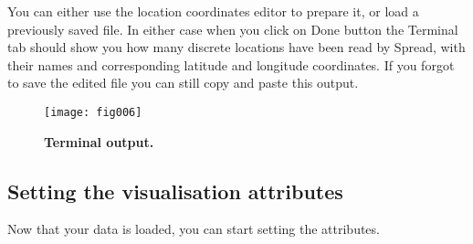 You can either use the location coordinates editor to prepare it,
or load a previously saved file. In either case when you click on
Done button the Terminal tab should show you how many discrete locations
have been read by Spread, with their names and corresponding latitude
and longitude coordinates. If you forgot to save the edited file you
can still copy and paste this output.

\begin{figure}[H]
\begin{centering}
\texttt{[image: fig006]}
\caption{
{ \footnotesize 
{\bf Terminal output.}
} %
}
\label{fig:006}
\par\end{centering}
\end{figure}

\subsection{Setting the visualisation attributes}

Now that your data is loaded, you can start setting the attributes.

